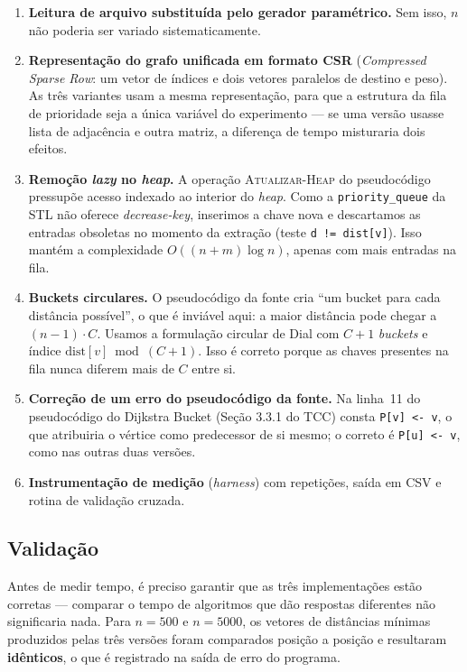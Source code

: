 \documentclass[12pt,a4paper]{article}
\begin{document}
\begin{enumerate}
  \item \textbf{Leitura de arquivo substituída pelo gerador paramétrico.}
        Sem isso, $n$ não poderia ser variado sistematicamente.
  \item \textbf{Representação do grafo unificada em formato CSR}
        (\emph{Compressed Sparse Row}: um vetor de índices e dois vetores
        paralelos de destino e peso). As três variantes usam a mesma
        representação, para que a estrutura da fila de prioridade seja a
        única variável do experimento --- se uma versão usasse lista de
        adjacência e outra matriz, a diferença de tempo misturaria dois
        efeitos.
  \item \textbf{Remoção \emph{lazy} no \emph{heap}.} A operação
        \textsc{Atualizar-Heap} do pseudocódigo pressupõe acesso indexado ao
        interior do \emph{heap}. Como a \texttt{priority\_queue} da STL não
        oferece \emph{decrease-key}, inserimos a chave nova e descartamos as
        entradas obsoletas no momento da extração (teste
        \texttt{d != dist[v]}). Isso mantém a complexidade
        $O((n+m)\log n)$, apenas com mais entradas na fila.
  \item \textbf{Buckets circulares.} O pseudocódigo da fonte cria ``um bucket
        para cada distância possível'', o que é inviável aqui: a maior
        distância pode chegar a $(n-1)\cdot C$. Usamos a formulação circular
        de Dial com $C+1$ \emph{buckets} e índice $\text{dist}[v] \bmod (C+1)$.
        Isso é correto porque as chaves presentes na fila nunca diferem mais
        de $C$ entre si.
  \item \textbf{Correção de um erro do pseudocódigo da fonte.} Na linha~11 do
        pseudocódigo do Dijkstra Bucket (Seção 3.3.1 do TCC) consta
        \texttt{P[v] <- v}, o que atribuiria o vértice como predecessor de si
        mesmo; o correto é \texttt{P[u] <- v}, como nas outras duas versões.
  \item \textbf{Instrumentação de medição} (\emph{harness}) com repetições,
        saída em CSV e rotina de validação cruzada.
\end{enumerate}

\subsection{Validação}

Antes de medir tempo, é preciso garantir que as três implementações estão
corretas --- comparar o tempo de algoritmos que dão respostas diferentes não
significaria nada. Para $n = 500$ e $n = 5000$, os vetores de distâncias
mínimas produzidos pelas três versões foram comparados posição a posição e
resultaram \textbf{idênticos}, o que é registrado na saída de erro do programa.
\end{document}
